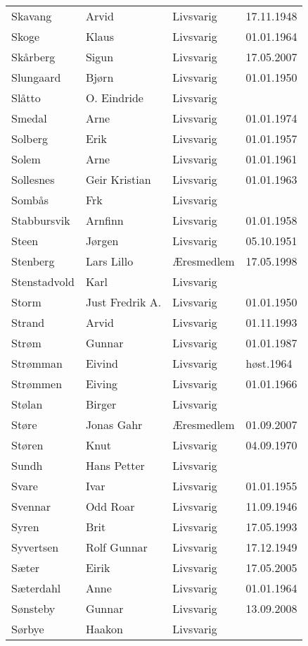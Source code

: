 \begin{longtable}{llll}
Skavang	&	Arvid	&	Livsvarig 	&	17.11.1948	\\
Skoge	&	Klaus	&	Livsvarig 	&	01.01.1964	\\
Skårberg	&	Sigun	&	Livsvarig	&	17.05.2007	\\
Slungaard	&	Bjørn	&	Livsvarig 	&	01.01.1950	\\
Slåtto	&	O. Eindride	&	Livsvarig 	&		\\
Smedal	&	Arne	&	Livsvarig 	&	01.01.1974	\\
Solberg	&	Erik	&	Livsvarig 	&	01.01.1957	\\
Solem	&	Arne	&	Livsvarig 	&	01.01.1961	\\
Sollesnes	&	Geir Kristian	&	Livsvarig 	&	01.01.1963	\\
Sombås	&	Frk	&	Livsvarig 	&		\\
Stabbursvik	&	Arnfinn	&	Livsvarig 	&	01.01.1958	\\
Steen	&	Jørgen	&	Livsvarig 	&	05.10.1951	\\
Stenberg 	&	Lars Lillo 	&	Æresmedlem	&	17.05.1998	\\
Stenstadvold	&	Karl	&	Livsvarig 	&		\\
Storm	&	Just Fredrik A.	&	Livsvarig 	&	01.01.1950	\\
Strand	&	Arvid	&	Livsvarig 	&	01.11.1993	\\
Strøm	&	Gunnar	&	Livsvarig 	&	01.01.1987	\\
Strømman	&	Eivind	&	Livsvarig 	&	høst.1964	\\
Strømmen	&	Eiving	&	Livsvarig 	&	01.01.1966	\\
Stølan	&	Birger	&	Livsvarig 	&		\\
Støre	&	Jonas Gahr	&	Æresmedlem	&	01.09.2007	\\
Støren	&	Knut	&	Livsvarig 	&	04.09.1970	\\
Sundh	&	Hans Petter	&	Livsvarig 	&		\\
Svare	&	Ivar	&	Livsvarig 	&	01.01.1955	\\
Svennar	&	Odd Roar	&	Livsvarig 	&	11.09.1946	\\
Syren	&	Brit	&	Livsvarig 	&	17.05.1993	\\
Syvertsen	&	Rolf Gunnar	&	Livsvarig 	&	17.12.1949	\\
Sæter 	&	Eirik	&	Livsvarig	&	17.05.2005	\\
Sæterdahl	&	Anne	&	Livsvarig 	&	01.01.1964	\\
Sønsteby	&	Gunnar	&	Livsvarig	&	13.09.2008	\\
Sørbye	&	Haakon	&	Livsvarig 	&		\\

\end{longtable}
